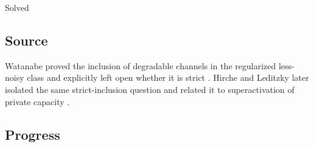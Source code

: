 Solved

\subsection*{Source}

Watanabe proved the inclusion of degradable channels in the regularized
less-noisy class and explicitly left open whether it is strict
. Hirche and Leditzky later isolated the same strict-inclusion question and related it to superactivation of private capacity .

\subsection*{Progress}

